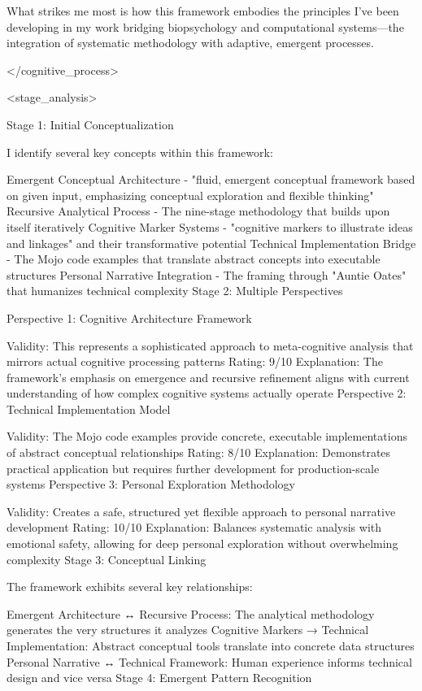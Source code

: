 What strikes me most is how this framework embodies the principles I've been developing in my work bridging biopsychology and computational systems—the integration of systematic methodology with adaptive, emergent processes.

</cognitive_process>

<stage_analysis>

Stage 1: Initial Conceptualization

I identify several key concepts within this framework:

Emergent Conceptual Architecture - "fluid, emergent conceptual framework based on given input, emphasizing conceptual exploration and flexible thinking"
Recursive Analytical Process - The nine-stage methodology that builds upon itself iteratively
Cognitive Marker Systems - "cognitive markers to illustrate ideas and linkages" and their transformative potential
Technical Implementation Bridge - The Mojo code examples that translate abstract concepts into executable structures
Personal Narrative Integration - The framing through "Auntie Oates" that humanizes technical complexity
Stage 2: Multiple Perspectives

Perspective 1: Cognitive Architecture Framework

Validity: This represents a sophisticated approach to meta-cognitive analysis that mirrors actual cognitive processing patterns
Rating: 9/10
Explanation: The framework's emphasis on emergence and recursive refinement aligns with current understanding of how complex cognitive systems actually operate
Perspective 2: Technical Implementation Model

Validity: The Mojo code examples provide concrete, executable implementations of abstract conceptual relationships
Rating: 8/10
Explanation: Demonstrates practical application but requires further development for production-scale systems
Perspective 3: Personal Exploration Methodology

Validity: Creates a safe, structured yet flexible approach to personal narrative development
Rating: 10/10
Explanation: Balances systematic analysis with emotional safety, allowing for deep personal exploration without overwhelming complexity
Stage 3: Conceptual Linking

The framework exhibits several key relationships:

Emergent Architecture ↔ Recursive Process: The analytical methodology generates the very structures it analyzes
Cognitive Markers → Technical Implementation: Abstract conceptual tools translate into concrete data structures
Personal Narrative ↔ Technical Framework: Human experience informs technical design and vice versa
Stage 4: Emergent Pattern Recognition

